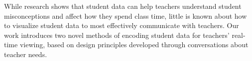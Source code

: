 \documentclass{sigchi}
\begin{document}



While research shows that student data can help teachers understand student misconceptions and affect how they spend class time, little is known about how to visualize student data to most effectively communicate with teachers. Our work introduces two novel methods of encoding student data for teachers' real-time viewing, based on design principles developed through conversations about teacher needs. 
\end{document}
